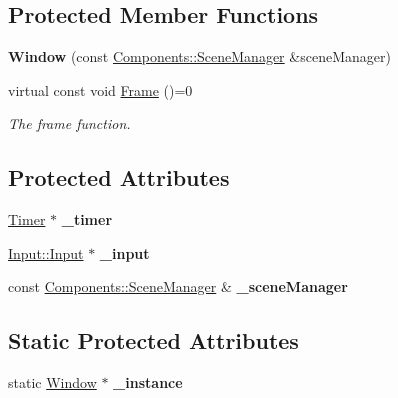 \subsection*{Protected Member Functions}
\begin{DoxyCompactItemize}
\item 
{\bfseries Window} (const \hyperlink{class_ensum_1_1_components_1_1_scene_manager}{Components\+::\+Scene\+Manager} \&scene\+Manager)\hypertarget{class_ensum_1_1_core_1_1_window_a53cec2362cd95f286102405c74bba278}{}\label{class_ensum_1_1_core_1_1_window_a53cec2362cd95f286102405c74bba278}

\item 
virtual const void \hyperlink{class_ensum_1_1_core_1_1_window_a58af9c1b06e0fe12820f584f4638ae15}{Frame} ()=0
\begin{DoxyCompactList}\small\item\em The frame function. \end{DoxyCompactList}\end{DoxyCompactItemize}
\subsection*{Protected Attributes}
\begin{DoxyCompactItemize}
\item 
\hyperlink{class_ensum_1_1_core_1_1_timer}{Timer} $\ast$ {\bfseries \+\_\+timer}\hypertarget{class_ensum_1_1_core_1_1_window_aa27d25534350ec8e46cf2eae67c82ea5}{}\label{class_ensum_1_1_core_1_1_window_aa27d25534350ec8e46cf2eae67c82ea5}

\item 
\hyperlink{class_ensum_1_1_input_1_1_input}{Input\+::\+Input} $\ast$ {\bfseries \+\_\+input}\hypertarget{class_ensum_1_1_core_1_1_window_a6b2925a490f7a5a2417059660713bc19}{}\label{class_ensum_1_1_core_1_1_window_a6b2925a490f7a5a2417059660713bc19}

\item 
const \hyperlink{class_ensum_1_1_components_1_1_scene_manager}{Components\+::\+Scene\+Manager} \& {\bfseries \+\_\+scene\+Manager}\hypertarget{class_ensum_1_1_core_1_1_window_aad7f2db4261a03e08e1878ed4e963bfe}{}\label{class_ensum_1_1_core_1_1_window_aad7f2db4261a03e08e1878ed4e963bfe}

\end{DoxyCompactItemize}
\subsection*{Static Protected Attributes}
\begin{DoxyCompactItemize}
\item 
static \hyperlink{class_ensum_1_1_core_1_1_window}{Window} $\ast$ {\bfseries \+\_\+instance}\hypertarget{class_ensum_1_1_core_1_1_window_aa4ca94e77186512ab2949dd6c7e850e6}{}\label{class_ensum_1_1_core_1_1_window_aa4ca94e77186512ab2949dd6c7e850e6}

\end{DoxyCompactItemize}


